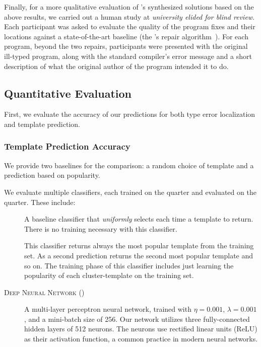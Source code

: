 Finally, for a more qualitative evaluation of \toolname's synthesized solutions
based on the above results, we carried out a human study at \emph{university
elided for blind review}. Each participant was asked to evaluate the quality of
the program fixes and their locations against a state-of-the-art baseline (the
\seminal's repair algorithm~\citep{Lerner2006-pj, Lerner2007-dt}). For each
program, beyond the two repairs, participants were presented with the original
ill-typed program, along with the standard \ocaml compiler's error message and a
short description of what the original author of the program intended it to do.

\subsection{Quantitative Evaluation}
\label{subsec:quan_eval}

First, we evaluate the accuracy of our predictions for both type error
localization and template prediction.


\subsubsection{Template Prediction Accuracy}
\label{subsubsec:templ_acc}

We provide two baselines for the comparison: a random choice of template and a
prediction based on popularity.

We evaluate multiple classifiers, each trained on the \SPRING quarter and evaluated
on the \FALL quarter. These include:
\begin{description}
  \item[\random] A baseline classifier that \emph{uniformly} selects each time a
    template to return. There is no training necessary with this classifier.
  \item[\popular] This classifier returns always the most popular template from
    the training set. As a second prediction returns the second most popular
    template and so on. The training phase of this classifier includes just
    learning the popularity of each cluster-template on the training set.
  \item[\textsc{Deep Neural Network} (\dnn)] A multi-layer perceptron neural
    network, trained with $\eta = 0.001$, $\lambda = 0.001$, and a mini-batch
    size of 256. Our network utilizes three fully-connected hidden layers of 512
    neurons. The neurons use rectified linear units (ReLU) as their activation
    function, a common practice in modern neural networks.
\end{description}

